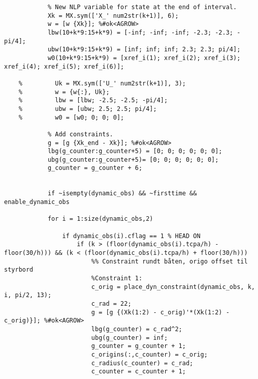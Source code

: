 \begin{lstlisting}
            % New NLP variable for state at the end of interval.
            Xk = MX.sym(['X_' num2str(k+1)], 6);
            w = [w {Xk}]; %#ok<AGROW> 
            lbw(10+k*9:15+k*9) = [-inf; -inf; -inf; -2.3; -2.3; -pi/4];
            ubw(10+k*9:15+k*9) = [inf; inf; inf; 2.3; 2.3; pi/4];
            w0(10+k*9:15+k*9) = [xref_i(1); xref_i(2); xref_i(3); xref_i(4); xref_i(5); xref_i(6)];
            
    %         Uk = MX.sym(['U_' num2str(k+1)], 3);
    %         w = {w{:}, Uk};
    %         lbw = [lbw; -2.5; -2.5; -pi/4];
    %         ubw = [ubw; 2.5; 2.5; pi/4];
    %         w0 = [w0; 0; 0; 0];
            
            % Add constraints.
            g = [g {Xk_end - Xk}]; %#ok<AGROW> 
            lbg(g_counter:g_counter+5) = [0; 0; 0; 0; 0; 0];
            ubg(g_counter:g_counter+5)= [0; 0; 0; 0; 0; 0];
            g_counter = g_counter + 6;
            
            
            if ~isempty(dynamic_obs) && ~firsttime && enable_dynamic_obs
            
            for i = 1:size(dynamic_obs,2)
               
                if dynamic_obs(i).cflag == 1 % HEAD ON
                    if (k > (floor(dynamic_obs(i).tcpa/h) - floor(30/h))) && (k < (floor(dynamic_obs(i).tcpa/h) + floor(30/h)))
                        %% Constraint rundt båten, origo offset til styrbord
                        %Constraint 1:
                        c_orig = place_dyn_constraint(dynamic_obs, k, i, pi/2, 13);
                        c_rad = 22;
                        g = [g {(Xk(1:2) - c_orig)'*(Xk(1:2) - c_orig)}]; %#ok<AGROW> 
                        lbg(g_counter) = c_rad^2;
                        ubg(g_counter) = inf;
                        g_counter = g_counter + 1;
                        c_origins(:,c_counter) = c_orig;
                        c_radius(c_counter) = c_rad;
                        c_counter = c_counter + 1;
                        

\end{lstlisting}
